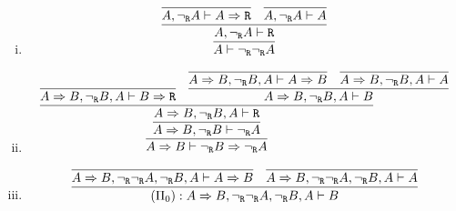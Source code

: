 \begin{enumerate}[(i)]
        \item 
            $$
                \infer{
                    A\vdash \ngr\ngr A
                }{
                    \infer{
                        A, \ngr A \vdash \R
                    }{
                        \infer{
                            A, \ngr A \vdash A\Rightarrow \R
                        }{
                        }&
                        \infer{
                            A, \ngr A \vdash A
                        }{
                        }
                    }
                }
            $$
        \item
            $$
                \infer{
                    A\Rightarrow B \vdash \ngr B \Rightarrow \ngr A
                }{
                    \infer{
                        A\Rightarrow B, \ngr B \vdash \ngr A
                    }{
                        \infer{
                            A\Rightarrow B, \ngr B,A \vdash \R
                        }{
                            \infer{
                                A\Rightarrow B, \ngr B,A \vdash B\Rightarrow \R
                            }{
                            }&
                            \infer{
                                A\Rightarrow B, \ngr B,A \vdash B
                            }{
                                \infer{
                                    A\Rightarrow B, \ngr B,A \vdash A\Rightarrow B
                                }{
                                }&
                                \infer{
                                    A\Rightarrow B, \ngr B,A \vdash A
                                }{
                                }
                            }
                        }
                    }
                }
            $$
        \item
            $$
                \infer{
                                        (\Pi_0) : A\Rightarrow B, \ngr\ngr A,\ngr B, A\vdash B
                                    }{
                                        \infer{
                                            A\Rightarrow B, \ngr\ngr A,\ngr B, A\vdash A\Rightarrow B
                                        }{
                                        }&
                                        \infer{
                                            A\Rightarrow B, \ngr\ngr A,\ngr B, A\vdash A
                                        }{
                                        }
                                    }
            $$

            \bigskip            
            

\end{enumerate}
